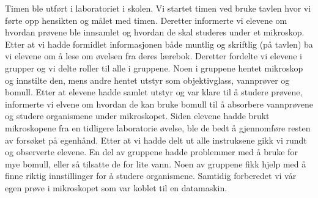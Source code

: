 \documentclass[main.tex]{subfiles}
\begin{document}
Timen ble utført i laboratoriet i skolen. Vi startet timen ved bruke tavlen hvor vi førte opp
hensikten og målet med timen. Deretter informerte vi elevene om hvordan prøvene ble innsamlet
og hvordan de skal studeres under et mikroskop. Etter at vi hadde formidlet informasjonen både
muntlig og skriftlig (på tavlen) ba vi elevene om å lese om øvelsen fra deres lærebok. Deretter
fordelte vi elevene i grupper og vi delte roller til alle i gruppene. Noen i gruppene hentet
mikroskop og innstilte den, mens andre hentet utstyr som objektivglass, vannprøver og bomull.
Etter at elevene hadde samlet utstyr og var klare til å studere prøvene, informerte vi elvene
om hvordan de kan bruke bomull til å absorbere vannprøvene og studere organismene under mikroskopet.
Siden elevene hadde brukt mikroskopene fra en tidligere laboratorie øvelse, ble de bedt å 
gjennomføre resten av forsøket på egenhånd. Etter at vi hadde delt ut alle instruksene gikk vi
rundt og observerte elevene. En del av gruppene hadde problemmer med å bruke for mye bomull, 
eller så tilsatte de for lite vann. Noen av gruppene fikk hjelp med å finne riktig innstillinger
for å studere organismene. Samtidig forberedet vi vår egen prøve i mikroskopet som var koblet 
til en datamaskin. 
\end{document}
